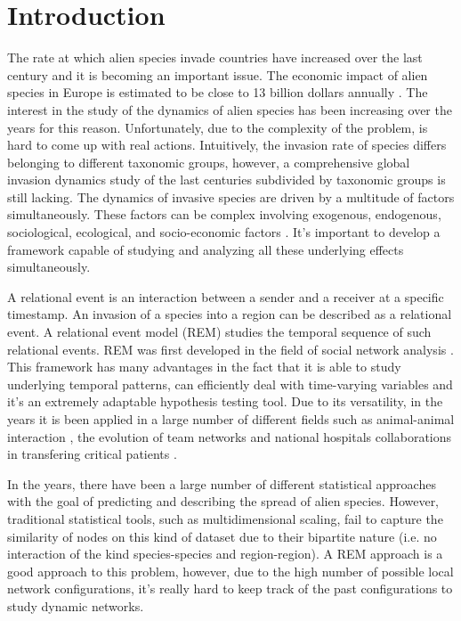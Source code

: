 \documentclass[mscthesis]{usiinfthesis}
\begin{document}
\chapter{Introduction}

The rate at which alien species invade countries have increased over the last century and it is becoming an important issue. The economic impact of alien species in Europe is estimated to be close to 13 billion dollars annually \cite{intro:rate}. The interest in the study of the dynamics of alien species has been increasing over the years for this reason. Unfortunately, due to the complexity of the problem, is hard to come up with real actions. Intuitively, the invasion rate of species differs belonging to different taxonomic groups, however, a comprehensive global invasion dynamics study of the last centuries subdivided by taxonomic groups is still lacking. The dynamics of invasive species are driven by a multitude of factors simultaneously. These factors can be complex involving exogenous, endogenous, sociological, ecological, and socio-economic factors \cite{intro:factors}. It's important to develop a framework capable of studying and analyzing all these underlying effects simultaneously. 

A relational event is an interaction between a sender and a receiver at a specific timestamp. An invasion of a species into a region can be described as a relational event. A relational event model (REM) studies the temporal sequence of such relational events. REM was first developed in the field of social network analysis \cite{rem:butts}. This framework has many advantages in the fact that it is able to study underlying temporal patterns, can efficiently deal with time-varying variables and it's an extremely adaptable hypothesis testing tool. Due to its versatility, in the years it is been applied in a large number of different fields such as animal-animal interaction \cite{intro:cattle}, the evolution of team networks \cite{intro:teams} and national hospitals collaborations in transfering critical patients \cite{intro:hospital}. 

In the years, there have been a large number of different statistical approaches with the goal of predicting and describing the spread of alien species. However, traditional statistical tools, such as multidimensional scaling, fail to capture the similarity of nodes on this kind of dataset due to their bipartite nature (i.e. no interaction of the kind species-species and region-region). A REM approach is a good approach to this problem, however, due to the high number of possible local network configurations, it's really hard to keep track of the past configurations to study dynamic networks.
\end{document}
